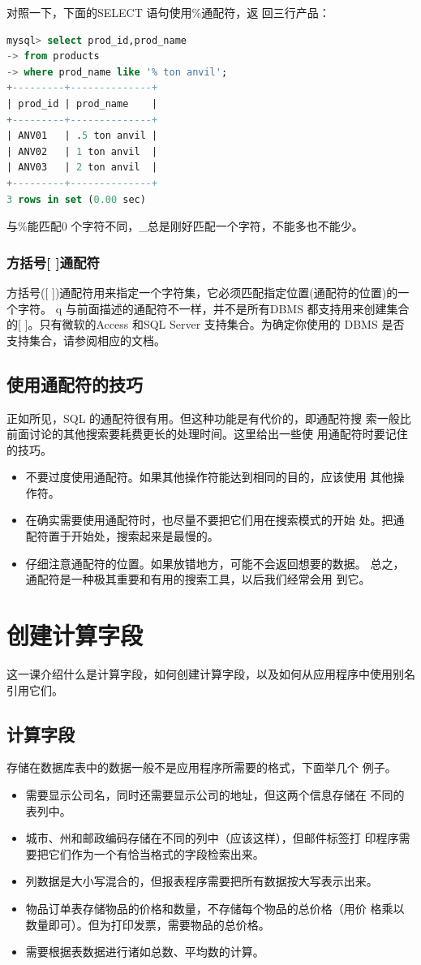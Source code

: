 \documentclass[11pt,a4paper,oneside]{book}
\begin{document}
对照一下，下面的SELECT 语句使用\%通配符，返
回三行产品：
\begin{lstlisting}[language=sql]
mysql> select prod_id,prod_name
-> from products
-> where prod_name like '% ton anvil';
+---------+--------------+
| prod_id | prod_name    |
+---------+--------------+
| ANV01   | .5 ton anvil |
| ANV02   | 1 ton anvil  |
| ANV03   | 2 ton anvil  |
+---------+--------------+
3 rows in set (0.00 sec)
\end{lstlisting}
与\%能匹配0 个字符不同，\_总是刚好匹配一个字符，不能多也不能少。

\subsection{方括号[ ]通配符}
方括号([ ])通配符用来指定一个字符集，它必须匹配指定位置(通配符的位置)的一个字符。
q
与前面描述的通配符不一样，并不是所有DBMS 都支持用来创建集合
的[ ]。只有微软的Access 和SQL Server 支持集合。为确定你使用的
DBMS 是否支持集合，请参阅相应的文档。

\section{使用通配符的技巧}
正如所见，SQL 的通配符很有用。但这种功能是有代价的，即通配符搜
索一般比前面讨论的其他搜索要耗费更长的处理时间。这里给出一些使
用通配符时要记住的技巧。
\begin{itemize}
	\item 不要过度使用通配符。如果其他操作符能达到相同的目的，应该使用
	其他操作符。
	\item 在确实需要使用通配符时，也尽量不要把它们用在搜索模式的开始
	处。把通配符置于开始处，搜索起来是最慢的。
	\item 仔细注意通配符的位置。如果放错地方，可能不会返回想要的数据。
	总之，通配符是一种极其重要和有用的搜索工具，以后我们经常会用
	到它。
\end{itemize}

\chapter{创建计算字段}
这一课介绍什么是计算字段，如何创建计算字段，以及如何从应用程序中使用别名引用它们。
\section{计算字段}
存储在数据库表中的数据一般不是应用程序所需要的格式，下面举几个
例子。
\begin{itemize}
	\item 需要显示公司名，同时还需要显示公司的地址，但这两个信息存储在
	不同的表列中。
	\item 城市、州和邮政编码存储在不同的列中（应该这样），但邮件标签打
	印程序需要把它们作为一个有恰当格式的字段检索出来。
	\item 列数据是大小写混合的，但报表程序需要把所有数据按大写表示出来。
	\item 物品订单表存储物品的价格和数量，不存储每个物品的总价格（用价
	格乘以数量即可）。但为打印发票，需要物品的总价格。
	\item 需要根据表数据进行诸如总数、平均数的计算。
\end{itemize}
\end{document}
